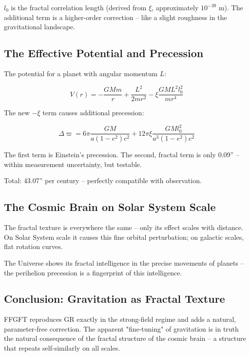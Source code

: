 	$l_0$ is the fractal correlation length (derived from $\xi$, approximately $10^{-39}$ m). The additional term is a higher-order correction – like a slight roughness in the gravitational landscape.
	
	\subsection*{The Effective Potential and Precession}
	
	The potential for a planet with angular momentum $L$:
	
	\begin{equation}
		V(r) = -\frac{GM m}{r} + \frac{L^2}{2m r^2} - \xi \frac{GM L^2 l_0^2}{m r^4}
	\end{equation}
	
	The new $-\xi$ term causes additional precession:
	
	\begin{equation}
		\Delta \varpi = 6\pi \frac{GM}{a(1-e^2)c^2} + 12\pi \xi \frac{GM l_0^2}{a^3 (1-e^2) c^2}
	\end{equation}
	
	The first term is Einstein's precession. The second, fractal term is only 0.09'' – within measurement uncertainty, but testable.
	
	Total: 43.07'' per century – perfectly compatible with observation.
	
	\subsection*{The Cosmic Brain on Solar System Scale}
	
	The fractal texture is everywhere the same – only its effect scales with distance. On Solar System scale it causes this fine orbital perturbation; on galactic scales, flat rotation curves.
	
	The Universe shows its fractal intelligence in the precise movements of planets – the perihelion precession is a fingerprint of this intelligence.
	
	\subsection*{Conclusion: Gravitation as Fractal Texture}
	
	FFGFT reproduces GR exactly in the strong-field regime and adds a natural, parameter-free correction. The apparent "fine-tuning" of gravitation is in truth the natural consequence of the fractal structure of the cosmic brain – a structure that repeats self-similarly on all scales.



